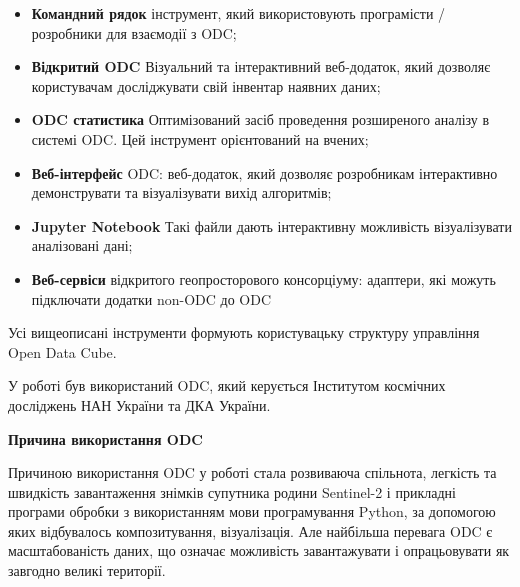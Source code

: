 \begin{itemize}
      \item \textbf{Командний рядок} інструмент, який %
використовують програмісти /
	    розробники для взаємодії з ODC;
      \item \textbf{Відкритий ODC} Візуальний та %
інтерактивний веб-додаток, який
      дозволяє
	    користувачам досліджувати свій інвентар %
наявних даних;
      \item \textbf{ODC статистика} Оптимізований засіб %
проведення розширеного аналізу в
	    системі ODC.  Цей інструмент орієнтований на %
вчених;
      \item \textbf{Веб-інтерфейс} ODC: веб-додаток, який %
дозволяє розробникам
      інтерактивно
	    демонструвати та візуалізувати вихід %
алгоритмів;
      \item \textbf{Jupyter Notebook} Такі файли дають %
інтерактивну можливість
	    візуалізувати аналізовані дані;
      \item \textbf{Веб-сервіси} відкритого %
геопросторового консорціуму: адаптери, які
	    можуть підключати додатки non-ODC до ODC
\end{itemize}


Усі вищеописані інструменти формують %
користувацьку структуру управління Open Data Cube.

У роботі був використаний ODC, який керується %
Інститутом космічних досліджень НАН
України та ДКА України.

\textbf{Причина використання ODC}

Причиною використання ODC у роботі стала %
розвиваюча спільнота, легкість та швидкість
завантаження знімків супутника родини Sentinel-2 і %
прикладні програми обробки з
використанням мови програмування Python, за %
допомогою яких відбувалось композитування,
візуалізація.  Але найбільша перевага ODC є %
масштабованість даних, що означає можливість
завантажувати і опрацьовувати як завгодно %
великі території.

